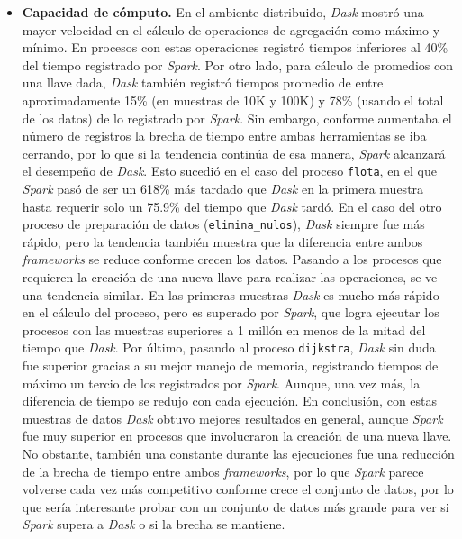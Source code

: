 \begin{itemize}
	\item \textbf{Capacidad de cómputo.} En el ambiente distribuido, \textit{Dask} mostró una mayor velocidad en el cálculo de operaciones de agregación como máximo y mínimo. En procesos con estas operaciones registró tiempos inferiores al 40\% del tiempo registrado por \textit{Spark}. Por otro lado, para cálculo de promedios con una llave dada, \textit{Dask} también registró tiempos promedio de entre aproximadamente 15\% (en muestras de 10K y 100K) y 78\% (usando el total de los datos) de lo registrado por \textit{Spark}. Sin embargo, conforme aumentaba el número de registros la brecha de tiempo entre ambas herramientas se iba cerrando, por lo que si la tendencia continúa de esa manera, \textit{Spark} alcanzará el desempeño de \textit{Dask}. Esto sucedió en el caso del proceso \texttt{flota}, en el que \textit{Spark} pasó de ser un 618\% más tardado que \textit{Dask} en la primera muestra hasta requerir solo un 75.9\% del tiempo que \textit{Dask} tardó. En el caso del otro proceso de preparación de datos (\texttt{elimina\_nulos}), \textit{Dask} siempre fue más rápido, pero la tendencia también muestra que la diferencia entre ambos \textit{frameworks} se reduce conforme crecen los datos. Pasando a los procesos que requieren la creación de una nueva llave para realizar las operaciones, se ve una tendencia similar. En las primeras muestras \textit{Dask} es mucho más rápido en el cálculo del proceso, pero es superado por \textit{Spark}, que logra ejecutar los procesos con las muestras superiores a 1 millón en menos de la mitad del tiempo que \textit{Dask}. Por último, pasando al proceso \texttt{dijkstra}, \textit{Dask} sin duda fue superior gracias a su mejor manejo de memoria, registrando tiempos de máximo un tercio de los registrados por \textit{Spark}. Aunque, una vez más, la diferencia de tiempo se redujo con cada ejecución. En conclusión, con estas muestras de datos \textit{Dask} obtuvo mejores resultados en general, aunque \textit{Spark} fue muy superior en procesos que involucraron la creación de una nueva llave. No obstante, también una constante durante las ejecuciones fue una reducción de la brecha de tiempo entre ambos \textit{frameworks}, por lo que \textit{Spark} parece volverse cada vez más competitivo conforme crece el conjunto de datos, por lo que sería interesante probar con un conjunto de datos más grande para ver si \textit{Spark} supera a \textit{Dask} o si la brecha se mantiene.
	

\end{itemize}
